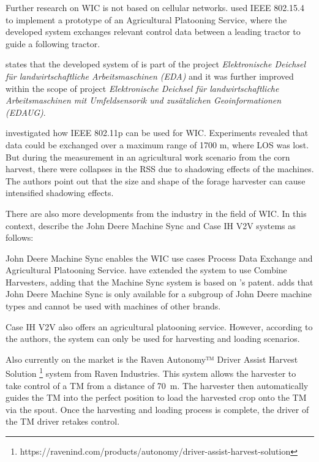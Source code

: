 Further research on \ac{WIC} is not based on cellular networks. \textcite{zhang_method_2009} used IEEE 802.15.4 to implement a
prototype of an Agricultural Platooning Service, where the developed system exchanges relevant control data between a leading tractor
to guide a following tractor.

\textcite{smolnik_5g_2020} states that the developed system of \textcite{zhang_method_2009} is part
of the project \textit{Elektronische Deichsel für landwirtschaftliche Arbeitsmaschinen (EDA)}
and it was further improved within the scope of project \textit{Elektronische Deichsel für landwirtschaftliche Arbeitsmaschinen mit Umfeldsensorik und zusätzlichen Geoinformationen (EDAUG)}.


\textcite{klingler_agriculture_2018} investigated how IEEE 802.11p can be used for \ac{WIC}. Experiments revealed
that data could be exchanged over a maximum range of 1700 m, where \ac{LOS} was lost. But during the
measurement in an agricultural work scenario from the corn harvest, there were collapses in the \ac{RSS}
due to shadowing effects of the machines. The authors point out that the size and shape of the forage harvester
can cause intensified shadowing effects.

There are also more developments from the industry in the field of \ac{WIC}. In this context, \textcite{thomasson_review_2018} describe the John Deere Machine Sync and Case IH V2V systems as follows:

John Deere Machine Sync enables the \ac{WIC} use cases Process Data Exchange and Agricultural Platooning Service. \textcite{liu_automation_2022} have extended the system to use Combine Harvesters, adding that the Machine Sync system is based on \textcite{metzler_system_2006}'s patent.
\textcite{smolnik_5g_2020} adds that John Deere Machine Sync is only available for a subgroup of John Deere machine types and cannot be used with machines of other brands.

Case IH V2V also offers an agricultural platooning service. However, according to the authors, the system can only be used for harvesting and loading scenarios.

Also currently on the market is the Raven Autonomy™ Driver Assist Harvest Solution \footnote{https://ravenind.com/products/autonomy/driver-assist-harvest-solution} system from Raven Industries. This system allows the harvester to take control of a \ac{TM} from a distance of \SI{70}{\metre}. The harvester then automatically guides the \ac{TM} into the perfect position to load the harvested crop onto the \ac{TM} via the spout. Once the harvesting and loading process is complete, the driver of the \ac{TM} driver retakes control.

